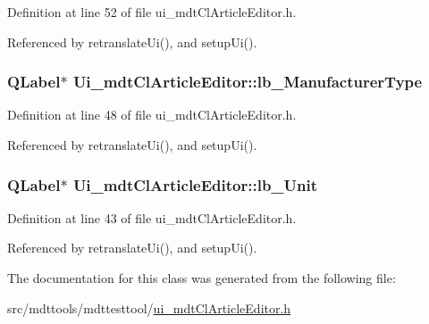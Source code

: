 Definition at line 52 of file ui\-\_\-mdt\-Cl\-Article\-Editor.\-h.



Referenced by retranslate\-Ui(), and setup\-Ui().

\hypertarget{class_ui__mdt_cl_article_editor_a982f02bbff1bdfd1e45f549456d48780}{
\subsubsection[{lb\-\_\-\-Manufacturer\-Type}]{\setlength{\rightskip}{0pt plus 5cm}Q\-Label$\ast$ Ui\-\_\-mdt\-Cl\-Article\-Editor\-::lb\-\_\-\-Manufacturer\-Type}}\label{class_ui__mdt_cl_article_editor_a982f02bbff1bdfd1e45f549456d48780}


Definition at line 48 of file ui\-\_\-mdt\-Cl\-Article\-Editor.\-h.



Referenced by retranslate\-Ui(), and setup\-Ui().

\hypertarget{class_ui__mdt_cl_article_editor_ac09bacf3ec4c03261af24576bbd66383}{
\subsubsection[{lb\-\_\-\-Unit}]{\setlength{\rightskip}{0pt plus 5cm}Q\-Label$\ast$ Ui\-\_\-mdt\-Cl\-Article\-Editor\-::lb\-\_\-\-Unit}}\label{class_ui__mdt_cl_article_editor_ac09bacf3ec4c03261af24576bbd66383}


Definition at line 43 of file ui\-\_\-mdt\-Cl\-Article\-Editor.\-h.



Referenced by retranslate\-Ui(), and setup\-Ui().



The documentation for this class was generated from the following file\-:\begin{DoxyCompactItemize}
\item 
src/mdttools/mdttesttool/\hyperlink{ui__mdt_cl_article_editor_8h}{ui\-\_\-mdt\-Cl\-Article\-Editor.\-h}\end{DoxyCompactItemize}
